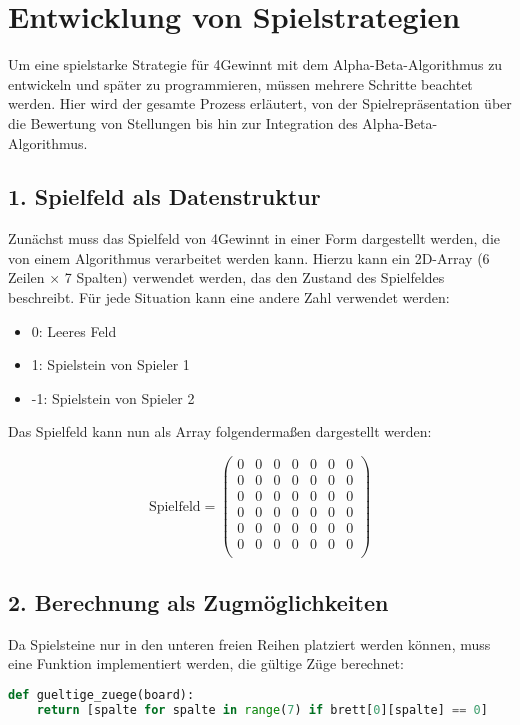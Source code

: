\section{Entwicklung von Spielstrategien}
	
Um eine spielstarke Strategie für 4Gewinnt mit dem Alpha-Beta-Algorithmus zu entwickeln und später zu programmieren, müssen mehrere Schritte beachtet werden. Hier wird der gesamte Prozess erläutert, von der Spielrepräsentation über die Bewertung von Stellungen bis hin zur Integration des Alpha-Beta-Algorithmus.

\subsection*{1. Spielfeld als Datenstruktur}
Zunächst muss das Spielfeld von 4Gewinnt in einer Form dargestellt werden, die von einem Algorithmus verarbeitet werden kann.
Hierzu kann ein 2D-Array (6 Zeilen × 7 Spalten) verwendet werden, das den Zustand des Spielfeldes beschreibt. Für jede Situation kann eine andere Zahl verwendet werden:
\begin{itemize}
	\item 0: Leeres Feld
	\item 1: Spielstein von Spieler 1
	\item -1: Spielstein von Spieler 2
\end{itemize}

Das Spielfeld kann nun als Array folgendermaßen dargestellt werden:

\[
\text{Spielfeld} =
\begin{pmatrix}
	0 & 0 & 0 & 0 & 0 & 0 & 0 \\
	0 & 0 & 0 & 0 & 0 & 0 & 0 \\
	0 & 0 & 0 & 0 & 0 & 0 & 0 \\
	0 & 0 & 0 & 0 & 0 & 0 & 0 \\
	0 & 0 & 0 & 0 & 0 & 0 & 0 \\
	0 & 0 & 0 & 0 & 0 & 0 & 0 \\
\end{pmatrix}
\]

\subsection*{2. Berechnung als Zugmöglichkeiten }
Da Spielsteine nur in den unteren freien Reihen platziert werden können, muss eine Funktion implementiert werden, die gültige Züge berechnet:

\begin{lstlisting}[language=Python, caption=Funktion zur Berechnung gültiger Züge]
	def gueltige_zuege(board):
	return [spalte for spalte in range(7) if brett[0][spalte] == 0]
\end{lstlisting}

